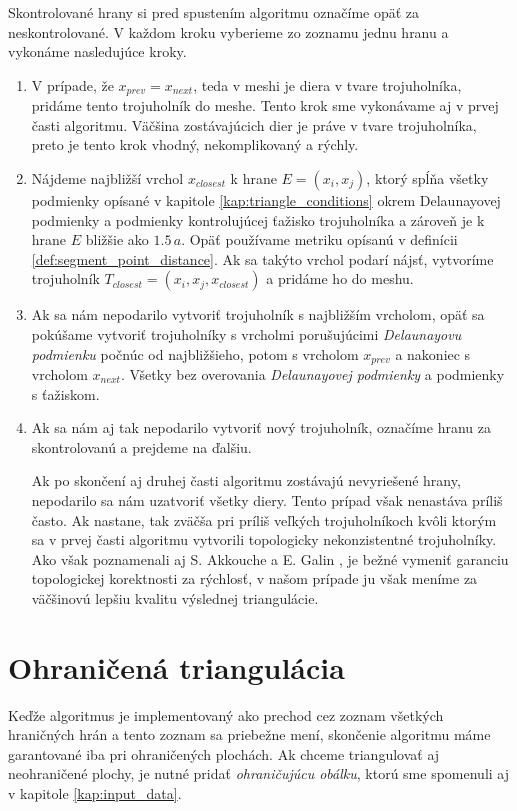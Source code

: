 Skontrolované hrany si pred spustením algoritmu označíme opäť za neskontrolované. V každom kroku vyberieme
zo zoznamu jednu hranu a vykonáme nasledujúce kroky.
\begin{enumerate}
    \item{
        V prípade, že $x_{prev} = x_{next}$, teda v meshi je diera v tvare trojuholníka, pridáme tento 
        trojuholník do meshe. Tento krok sme vykonávame aj v prvej časti algoritmu. Väčšina zostávajúcich
        dier je práve v tvare trojuholníka, preto je tento krok vhodný, nekomplikovaný a rýchly.
    }
    \item{
        Nájdeme najbližší vrchol $x_{closest}$ k hrane $E = (x_i, x_j)$, ktorý spĺňa všetky podmienky 
        opísané v kapitole \ref{kap:triangle_conditions} okrem Delaunayovej podmienky a podmienky 
        kontrolujúcej ťažisko trojuholníka a zároveň je k hrane $E$ bližšie ako $1.5 \, a$. 
        Opäť používame metriku 
        opísanú v definícii \ref{def:segment_point_distance}. Ak sa takýto vrchol podarí nájsť, 
        vytvoríme trojuholník $T_{closest} = (x_i, x_j, x_{closest})$ a pridáme ho do meshu.
    }
    \item{
        Ak sa nám nepodarilo vytvoriť trojuholník s najbližším vrcholom, opäť sa pokúšame vytvoriť 
        trojuholníky s vrcholmi porušujúcimi \textit{Delaunayovu podmienku} počnúc od najbližšieho, 
        potom s vrcholom $x_{prev}$
        a nakoniec s vrcholom $x_{next}$. Všetky bez overovania \textit{Delaunayovej podmienky} a 
        podmienky s ťažiskom.
    }
    \item{
        Ak sa nám aj tak nepodarilo vytvoriť nový trojuholník, označíme hranu za skontrolovanú a prejdeme
        na ďalšiu.
    }
    
    Ak po skončení aj druhej časti algoritmu zostávajú nevyriešené hrany, nepodarilo sa nám 
    uzatvoriť všetky diery. Tento prípad však nenastáva príliš často. Ak nastane, tak zväčša pri 
    príliš veľkých trojuholníkoch kvôli ktorým sa v prvej časti algoritmu vytvorili topologicky
    nekonzistentné trojuholníky. Ako však poznamenali aj S. Akkouche a E. Galin 
    \cite{akkouche2001adaptive}, je bežné vymeniť garanciu topologickej korektnosti za rýchlosť, 
    v našom prípade ju však meníme za väčšinovú lepšiu kvalitu výslednej triangulácie. 
\end{enumerate}

\section{Ohraničená triangulácia}
\label{kap:bounded_triangulation}
Keďže algoritmus je implementovaný ako prechod cez zoznam všetkých hraničných hrán a tento zoznam 
sa priebežne mení, skončenie algoritmu máme garantované iba pri ohraničených plochách.
Ak chceme triangulovať aj neohraničené plochy, je nutné pridať \textit{ohraničujúcu obálku}, 
ktorú sme spomenuli aj v kapitole \ref{kap:input_data}.

